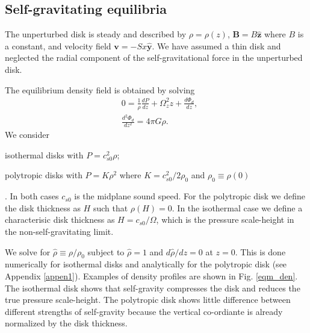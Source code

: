 \subsection{Self-gravitating equilibria} 
The unperturbed disk is steady and described by
$\rho=\rho(z)$, $\bm{B} = B\hat{\bm{z}}$ where $B$ is a constant, and
velocity field $\bm{v} = -Sx\hat{\bm{y}}$. We have assumed a thin disk 
and neglected the radial component of the self-gravitational force in
the unperturbed disk.    

The equilibrium density field is obtained by solving
\begin{align}
  &0=\frac{1}{\rho}\frac{d P}{dz} + \Omega_z^2z + \frac{d\Phi_d}{dz},\label{eqm_eqns1}\\
  &\frac{d^2\Phi_d}{dz^2} = 4\pi G \rho.\label{eqm_eqns2}
\end{align}
We consider \begin{inparaenum}[(i)]
\item isothermal disks with $P=c_{s0}^2\rho$\label{iso_eos}; 
\item polytropic disks with $P=K\rho^2$ where $K=c_{s0}^2/2\rho_0$ and $\rho_0\equiv\rho(0)$
\end{inparaenum}.
In both cases $c_{s0}$ is the midplane sound speed. For the polytropic
disk we define the disk thickness as $H$ such that $\rho(H)=0$. In the
isothermal case we define a characterisic disk thickness as
$H=c_{s0}/\Omega$, which is the pressure scale-height in the
non-self-gravitating limit. 

We solve for $\hat{\rho}\equiv\rho/\rho_0$ subject to $\hat{\rho}=1$
and $d\hat{\rho}/dz=0$  at $z=0$. This is done numerically for
isothermal disks and analytically for the polytropic disk (see
Appendix \ref{appen1}). Examples of density profiles are shown in
Fig. \ref{eqm_den}. The isothermal disk shows that self-gravity
compresses the disk and reduces the true pressure scale-height. The
polytropic disk shows little difference between different strengths of
self-gravity because the vertical co-ordiante is already normalized by
the disk thickness. 

